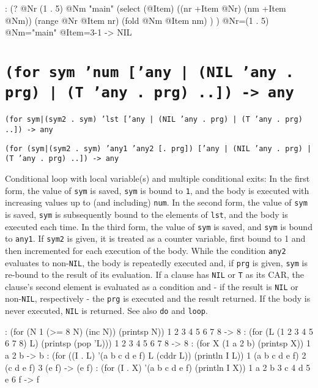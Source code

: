 \begin{wideverbatim}
: (?
   @Nr (1 . 5)
   @Nm "main"
   (select (@Item)
      ((nr +Item @Nr) (nm +Item @Nm))
      (range @Nr @Item nr)
      (fold @Nm @Item nm) ) )
 @Nr=(1 . 5) @Nm="main" @Item={3-1}
-> NIL
\end{wideverbatim}

 
\section*{\texttt{(for sym 'num ['any | (NIL 'any . prg) | (T 'any . prg) ..]) -> any}}
\label{sec:func-ref-F-(for sym 'num ['any | (NIL 'any . prg) | (T 'any . prg) ..]) -> any}


\texttt{(for sym|(sym2 . sym) 'lst ['any | (NIL 'any . prg) | (T 'any . prg) ..]) -> any}

\texttt{(for (sym|(sym2 . sym) 'any1 'any2 [. prg]) ['any | (NIL 'any . prg) | (T 'any . prg) ..]) -> any}

Conditional loop with local variable(s) and multiple conditional exits:
In the first form, the value of \texttt{sym} is saved, \texttt{sym} is bound to \texttt{1},
and the body is executed with increasing values up to (and including)
\texttt{num}. In the second form, the value of \texttt{sym} is saved, \texttt{sym} is
subsequently bound to the elements of \texttt{lst}, and the body is executed
each time. In the third form, the value of \texttt{sym} is saved, and \texttt{sym} is
bound to \texttt{any1}. If \texttt{sym2} is given, it is treated as a counter
variable, first bound to 1 and then incremented for each execution of
the body. While the condition \texttt{any2} evaluates to non-\texttt{NIL}, the body is
repeatedly executed and, if \texttt{prg} is given, \texttt{sym} is re-bound to the
result of its evaluation. If a clause has \texttt{NIL} or \texttt{T} as its CAR, the
clause's second element is evaluated as a condition and - if the result
is \texttt{NIL} or non-\texttt{NIL}, respectively - the \texttt{prg} is executed and the
result returned. If the body is never executed, \texttt{NIL} is returned. See
also \texttt{do} and \texttt{loop}.


\begin{wideverbatim}
: (for (N 1 (>= 8 N) (inc N)) (printsp N))
1 2 3 4 5 6 7 8 -> 8
: (for (L (1 2 3 4 5 6 7 8) L) (printsp (pop 'L)))
1 2 3 4 5 6 7 8 -> 8
: (for X (1 a 2 b) (printsp X))
1 a 2 b -> b
: (for ((I . L) '(a b c d e f) L (cddr L)) (println I L))
1 (a b c d e f)
2 (c d e f)
3 (e f)
-> (e f)
: (for (I . X) '(a b c d e f) (println I X))
1 a
2 b
3 c
4 d
5 e
6 f
-> f
\end{wideverbatim}

